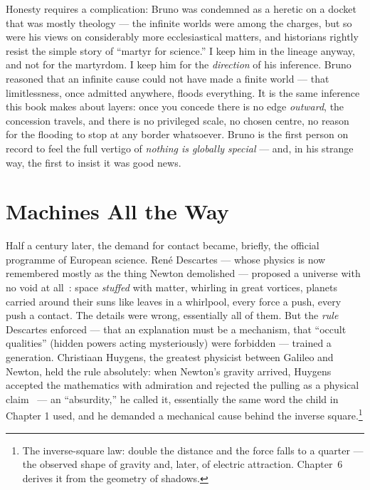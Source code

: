 \documentclass[fontsize=11pt,paper=a4,pagesize=auto,parskip=half-]{scrbook}
\newcommand{\Iy}[1]{#1\index{#1}}
\begin{document}
Honesty requires a complication: Bruno was condemned as a heretic on a docket that was mostly theology --- the infinite worlds were among the charges, but so were his views on considerably more ecclesiastical matters, and historians rightly resist the simple story of ``martyr for science.'' I keep him in the lineage anyway, and not for the martyrdom. I keep him for the \emph{direction} of his inference. Bruno reasoned that an infinite cause could not have made a finite world --- that limitlessness, once admitted anywhere, floods everything. It is the same inference this book makes about layers: once you concede there is no edge \emph{outward}, the concession travels, and there is no privileged scale, no chosen centre, no reason for the flooding to stop at any border whatsoever. Bruno is the first person on record to feel the full vertigo of \emph{nothing is globally special} --- and, in his strange way, the first to insist it was good news.

\section{Machines All the Way}

Half a century later, the demand for contact became, briefly, the official programme of European science. René \Iy{Descartes} --- whose physics is now remembered mostly as the thing Newton demolished --- proposed a universe with no void at all~\cite{descartes1644}: space \emph{stuffed} with matter, whirling in great vortices, planets carried around their suns like leaves in a whirlpool, every force a push, every push a contact. The details were wrong, essentially all of them. But the \emph{rule} Descartes enforced --- that an explanation must be a mechanism, that ``occult qualities'' (hidden powers acting mysteriously) were forbidden --- trained a generation. Christiaan \Iy{Huygens}, the greatest physicist between \Iy{Galileo} and Newton, held the rule absolutely: when Newton's gravity arrived, Huygens accepted the mathematics with admiration and rejected the pulling as a physical claim~\cite{huygens1690} --- an ``absurdity,'' he called it, essentially the same word the child in Chapter 1 used, and he demanded a mechanical cause behind the inverse square.\footnote{The inverse-square law: double the distance and the force falls to a quarter --- the observed shape of gravity and, later, of electric attraction. Chapter~6 derives it from the geometry of shadows.}
\end{document}
